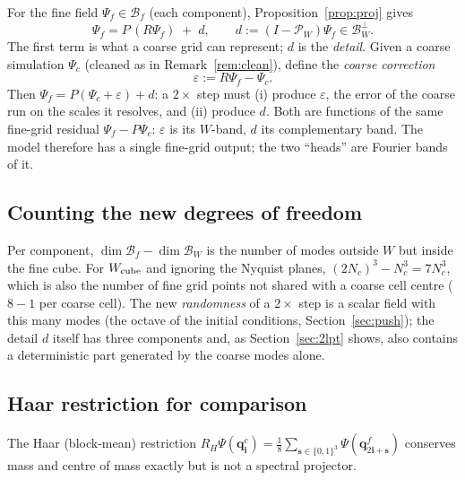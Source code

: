 \documentclass[11pt]{article}
\theoremstyle{definition}
\newcommand{\q}{\mathbf{q}}
\newcommand{\Psic}{\Psi_{c}}
\newcommand{\Psif}{\Psi_{f}}
\newcommand{\PW}{\mathcal{P}_W}
\newcommand{\Bf}{\mathcal{B}_f}
\newcommand{\BW}{\mathcal{B}_W}
\begin{document}
For the fine field $\Psif\in\Bf$ (each component), Proposition~\ref{prop:proj} gives
\begin{equation}
\boxed{\ \Psif=P\,(R\Psif)\;+\;d,\qquad d:=(I-\PW)\Psif\in\BW^\perp .\ }
\label{eq:decomp}
\end{equation}
The first term is what a coarse grid can represent; $d$ is the \emph{detail}. Given a coarse simulation $\Psic$ (cleaned as in Remark~\ref{rem:clean}), define the \emph{coarse correction}
\begin{equation}
\varepsilon:=R\Psif-\Psic .
\label{eq:eps}
\end{equation}
Then $\Psif=P(\Psic+\varepsilon)+d$: a $2\times$ step must (i) produce $\varepsilon$, the error of the coarse run on the scales it resolves, and (ii) produce $d$. Both are functions of the same fine-grid residual $\Psif-P\Psic$: $\varepsilon$ is its $W$-band, $d$ its complementary band. The model therefore has a single fine-grid output; the two ``heads'' are Fourier bands of it.

\subsection{Counting the new degrees of freedom}

Per component, $\dim\Bf-\dim\BW$ is the number of modes outside $W$ but inside the fine cube. For $W_{\rm cube}$ and ignoring the Nyquist planes, $(2N_c)^3-N_c^3=7N_c^3$, which is also the number of fine grid points not shared with a coarse cell centre ($8-1$ per coarse cell). The new \emph{randomness} of a $2\times$ step is a scalar field with this many modes (the octave of the initial conditions, Section~\ref{sec:push}); the detail $d$ itself has three components and, as Section~\ref{sec:2lpt} shows, also contains a deterministic part generated by the coarse modes alone.

\subsection{Haar restriction for comparison}

The Haar (block-mean) restriction $R_H\Psi(\q^c_{\mathbf i})=\tfrac18\sum_{\mathbf s\in\{0,1\}^3}\Psi(\q^f_{2\mathbf i+\mathbf s})$ conserves mass and centre of mass exactly but is not a spectral projector.
\end{document}
